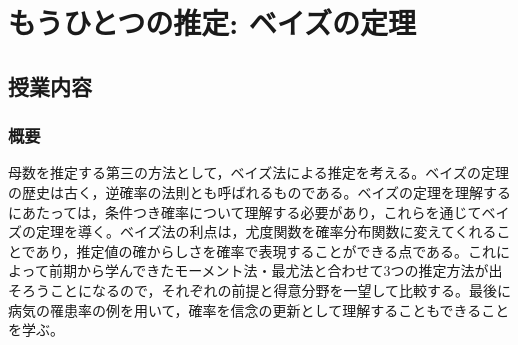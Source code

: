 \section{もうひとつの推定: ベイズの定理}
\label{b25_bayesian_intro}
\subsection{授業内容}
\subsubsection{概要}
母数を推定する第三の方法として，ベイズ法による推定を考える。ベイズの定理の歴史は古く，逆確率の法則とも呼ばれるものである。ベイズの定理を理解するにあたっては，条件つき確率について理解する必要があり，これらを通じてベイズの定理を導く。ベイズ法の利点は，尤度関数を確率分布関数に変えてくれることであり，推定値の確からしさを確率で表現することができる点である。これによって前期から学んできたモーメント法・最尤法と合わせて3つの推定方法が出そろうことになるので，それぞれの前提と得意分野を一望して比較する。最後に病気の罹患率の例を用いて，確率を信念の更新として理解することもできることを学ぶ。
